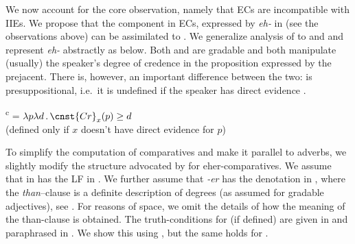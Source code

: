 \documentclass[output=paper,colorlinks,citecolor=brown,newtxmath]{langsci/langscibook}
\begin{document}
	 \label{pofi}
    \z

\noindent We now account for the core observation, namely that ECs are incompatible with IIEs. We propose that the   component in ECs, expressed by \textit{eh-} in  (see the observations above) can be assimilated to  . We generalize  analysis of  to  and  and represent \textit{eh-} abstractly as
 below. Both  and  are gradable and both manipulate (usually) the speaker's degree of credence in the proposition expressed by the prejacent. There is, however, an important difference between the two:  is presuppositional, i.e.\ it is undefined if the speaker has direct evidence \citep[see the discussion in][]{herrub14}.

	 \ea {}\textsuperscript{c} = $\lambda p\lambda d\,.\,\cnst{Cr}_{x}(p) \geq d$\\  (defined only if $x$ doesn't have direct evidence for $p$) \label{}
 	\z

\noindent To simplify the computation of comparatives and make it parallel to  adverbs, we slightly modify the structure advocated by \citet{herrub14} for eher-comparatives. We assume that  in  has the LF in . We further assume that \textit{-er} has the denotation in , where the \textit{than}--clause is a definite description of degrees (as assumed for gradable adjectives), see . For reasons of space, we omit the details of how the meaning of the than-clause is obtained.
The truth-conditions for  (if defined) are given in  and paraphrased in . We show this using , but the same holds for .
\end{document}
